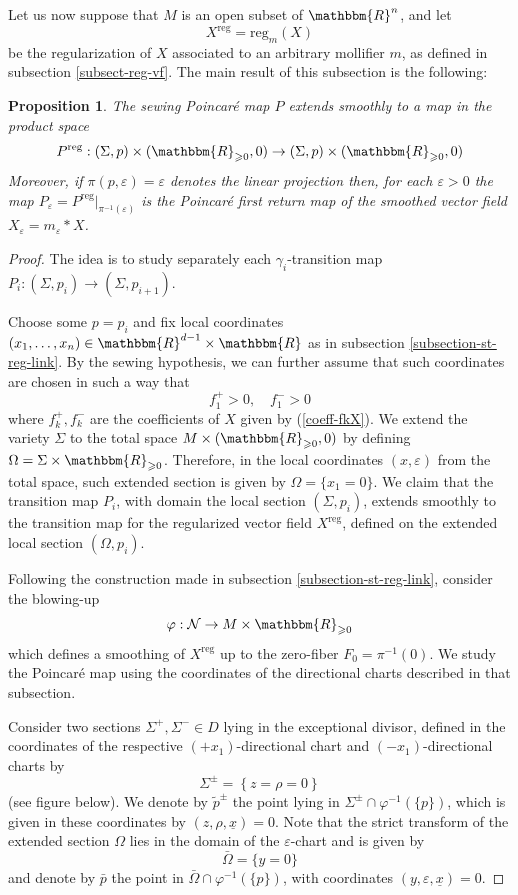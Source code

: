 \documentclass[11pt,psamsfonts]{article}
\newtheorem{Proposition}[Theorem]{Proposition}
\theoremstyle{definition}
\theoremstyle{remark}
\newcommand{\cR}{\ensuremath{\mathbbm{R}}}
\newcommand{\eps}{\varepsilon }
\newcommand{\reg}{\mathrm{reg}}
\begin{document}
Let us now suppose that $M$ is an open subset of $\cR^n$, and let 
$$X^\reg = \reg_m(X)$$ be the regularization of $X$ associated to an arbitrary mollifier $m$, as defined in subsection \ref{subsect-reg-vf}. 
The main result of this subsection is the following:
\begin{Proposition}\label{prop-regularized-poincare}
 The sewing Poincaré map
  $P$ extends smoothly to a map in the product space
  $$P^\reg:(\Sigma, p) \times (\cR_{\geqslant 0}, 0) \rightarrow (\Sigma, p) \times (\cR_{\geqslant 0}, 0)$$
 Moreover, if $\pi(p,\eps)=\eps$ denotes the linear projection then, for each $\eps > 0$ the map $P_\eps = P^\reg|_{\pi^{-1}(\eps)}$ is the Poincar{\'e} first return map of the
smoothed vector field $X_{\eps} = m_\eps \ast X$.  
\end{Proposition}
\begin{proof}
  The idea is to study separately each $\gamma_i$-transition map $P_i :
  (\Sigma, p_i) \rightarrow (\Sigma, p_{i + 1})$.
  
  Choose some $p = p_i$ and fix local coordinates $(x_1,\ldots,x_n) \in \cR^{d
  - 1} \times \cR$ as in subsection \ref{subsection-st-reg-link}. By the
  sewing hypothesis, we can further assume that such coordinates are chosen in
  such a way that
  \begin{equation}\label{sewing-hypothesis-f1}
    f_1^+ > 0, \quad f_1^- > 0 
  \end{equation}
  where $f_k^+,f_k^-$ are the coefficients of $X$ given by
  (\ref{coeff-fkX}). We extend the variety $\Sigma$ to the total space $M
  \times (\cR_{\geqslant 0}, 0)$ by defining
  $\Omega = \Sigma \times \cR_{\geqslant 0}$.
  Therefore, in the local coordinates $\left( x, \eps \right)$
  from the total space, such extended section is given by $\Omega = \{ x_1 = 0
  \}$. We claim that the transition map $P_i$, with domain the local
  section $(\Sigma, p_i)$, extends smoothly to the transition map for
  the regularized vector field $X^\reg$, defined on the extended local section $(\Omega,
  p_i)$.
  
  Following the construction made in subsection \ref{subsection-st-reg-link},
  consider the blowing-up
  \[ \varphi : \mathcal{N} \rightarrow M \times \cR_{\geqslant 0} \]
  which defines a smoothing of $X^\reg$ up to the zero-fiber $F_0 = \pi^{-1}(0)$. We
  study the Poincaré map using the coordinates of the directional charts described in that subsection.
  
  Consider two sections $\Sigma^+, \Sigma^-  \in D$ lying in the
  exceptional divisor, defined in the coordinates of the respective $(+
  x_1)$-directional chart and $(- x_1)$-directional charts by
  \[ \Sigma^{\pm} = \left\{ z = \rho = 0 \right\} \]
  (see figure below). We denote by $\tilde{p}^{\pm}$ the point lying in
  $\Sigma^{\pm} \cap \varphi^{- 1} (\{ p \})$, which is given in these
  coordinates by $\left( z,\rho,\underline{x} \right) = 0$.
  Note that the strict transform of the extended section $\Omega$ lies in the
  domain of the $\eps$-chart and is given by
  \[ \bar{\Omega} = \{ y = 0 \} \]
  and denote by $\bar{p}$ the point in $\bar{\Omega} \cap \varphi^{- 1} (\{ p
  \})$, with coordinates $\left( y, \eps,\underline{x} \right) =
  0$.
  

\end{proof}
\end{document}
